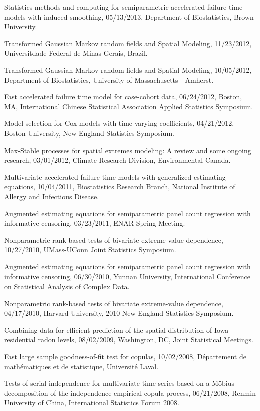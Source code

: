 \documentclass[Statistics]{vita}
\begin{document}
\begin{vita}
\begin{InvitedTalksLectures}
\begin{InvitedTalks}
  \item Statistics methods and computing for semiparametric accelerated failure time models with induced smoothing, 05/13/2013, Department of Biostatistics, Brown University.
  \item Transformed Gaussian Markov random fields and Spatial Modeling, 11/23/2012, Universitdade Federal de Minas Gerais, Brazil.
  \item Transformed Gaussian Markov random fields and Spatial Modeling, 10/05/2012, Department of Biostatistics, University of Massachusetts---Amherst.
  \item Fast accelerated failure time model for case-cohort data, 06/24/2012, Boston, MA, International Chinese Statistical Association Applied Statistics Symposium.
  \item Model selection for Cox models with time-varying coefficients, 04/21/2012, Boston University, New England Statistics Symposium.
  \item Max-Stable processes for spatial extremes modeling: A review and some ongoing research, 03/01/2012, Climate Research Division, Environmental Canada.
  \item Multivariate accelerated failure time models with generalized estimating equations, 10/04/2011, Biostatistics Research Branch, National Institute of Allergy and Infectious Disease.
  \item Augmented estimating equations for semiparametric panel count regression with informative censoring, 03/23/2011, ENAR Spring Meeting.
  \item Nonparametric rank-based tests of bivariate extreme-value dependence, 10/27/2010, UMass-UConn Joint Statistics Symposium.
  \item Augmented estimating equations for semiparametric panel count regression with informative censoring, 06/30/2010, Yunnan University, International Conference on Statistical Analysis of Complex Data.
  \item Nonparametric rank-based tests of bivariate extreme-value dependence, 04/17/2010, Harvard University, 2010 New England Statistics Symposium.
  \item Combining data for efficient prediction of the spatial distribution of Iowa residential radon levels, 08/02/2009, Washington, DC, Joint Statistical Meetings.
  \item Fast large sample goodness-of-fit test for copulas, 10/02/2008, D\'epartement de math\'ematiques et de statistique, Universit\'e Laval.
  \item Tests of serial independence for multivariate time series based on a M\"obius decomposition of the independence empirical copula process, 06/21/2008, Renmin University of China, International Statistics Forum 2008.

\end{InvitedTalks}
\end{InvitedTalksLectures}
\end{vita}
\end{document}
